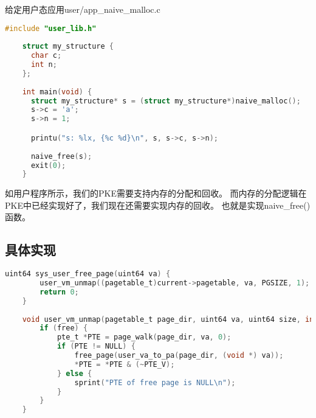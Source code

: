 给定用户态应用user/app\_naive\_malloc.c

\begin{lstlisting}[caption={用户态应用app\_naive\_malloc.c}, label={lst:app_naive_malloc}, language=C]
    #include "user_lib.h"
    
    struct my_structure {
      char c;
      int n;
    };
    
    int main(void) {
      struct my_structure* s = (struct my_structure*)naive_malloc();
      s->c = 'a';
      s->n = 1;

      printu("s: %lx, {%c %d}\n", s, s->c, s->n);
    
      naive_free(s);
      exit(0);
    }   
\end{lstlisting}

如用户程序所示，我们的PKE需要支持内存的分配和回收。
而内存的分配逻辑在PKE中已经实现好了，我们现在还需要实现内存的回收。
也就是实现naive\_free()函数。


\subsection{具体实现}

\begin{lstlisting}[caption={内存回收实现}, label={lst:naive_free}, language=C]
    uint64 sys_user_free_page(uint64 va) {
        user_vm_unmap((pagetable_t)current->pagetable, va, PGSIZE, 1);
        return 0;
    }  
    
    void user_vm_unmap(pagetable_t page_dir, uint64 va, uint64 size, int free) {
        if (free) {
            pte_t *PTE = page_walk(page_dir, va, 0);
            if (PTE != NULL) {
                free_page(user_va_to_pa(page_dir, (void *) va));
                *PTE = *PTE & (~PTE_V);
            } else {
                sprint("PTE of free page is NULL\n");
            }
        }
    }    
\end{lstlisting}

